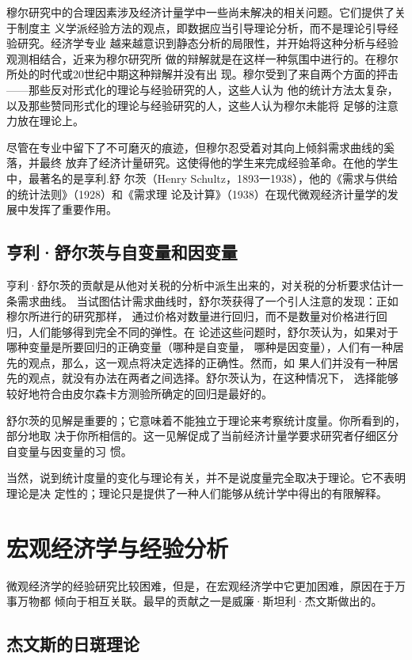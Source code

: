 穆尔研究中的合理因素涉及经济计量学中一些尚未解决的相关问题。它们提供了关于制度主
义学派经验方法的观点，即数据应当引导理论分析，而不是理论引导经验研究。经济学专业
越来越意识到静态分析的局限性，并开始将这种分析与经验观测相结合，近来为穆尔研究所
做的辩解就是在这样一种氛围中进行的。在穆尔所处的时代或20世纪中期这种辩解并没有出
现。穆尔受到了来自两个方面的抨击——那些反对形式化的理论与经验研究的人，这些人认为
他的统计方法太复杂，以及那些赞同形式化的理论与经验研究的人，这些人认为穆尔未能将
足够的注意力放在理论上。

尽管在专业中留下了不可磨灭的痕迹，但穆尔忍受着对其向上倾斜需求曲线的奚落，并最终
放弃了经济计量研究。这使得他的学生来完成经验革命。在他的学生中，最著名的是享利.舒
尔茨（Henry Schultz，1893一1938），他的《需求与供给的统计法则》（1928）和《需求理
论及计算》（1938）在现代微观经济计量学的发展中发挥了重要作用。

\subsection{亨利·舒尔茨与自变量和因变量}

亨利·舒尔茨的贡献是从他对关税的分析中派生出来的，对关税的分析要求估计一条需求曲线。
当试图估计需求曲线时，舒尔茨获得了一个引人注意的发现：正如穆尔所进行的研究那样，
通过价格对数量进行回归，而不是数量对价格进行回归，人们能够得到完全不同的弹性。在
论述这些问题时，舒尔茨认为，如果对于哪种变量是所要回归的正确变量（哪种是自变量，
哪种是因变量），人们有一种居先的观点，那么，这一观点将决定选择的正确性。然而，如
果人们并没有一种居先的观点，就没有办法在两者之间选择。舒尔茨认为，在这种情况下，
选择能够较好地符合由皮尔森卡方测验所确定的回归是最好的。

舒尔茨的见解是重要的；它意味着不能独立于理论来考察统计度量。你所看到的，部分地取
决于你所相信的。这一见解促成了当前经济计量学要求研究者仔细区分自变量与因变量的习
惯。

当然，说到统计度量的变化与理论有关，并不是说度量完全取决于理论。它不表明理论是决
定性的；理论只是提供了一种人们能够从统计学中得出的有限解释。

\section{宏观经济学与经验分析}

微观经济学的经验研究比较困难，但是，在宏观经济学中它更加困难，原因在于万事万物都
倾向于相互关联。最早的贡献之一是威廉·斯坦利·杰文斯做出的。

\subsection{杰文斯的日斑理论}

